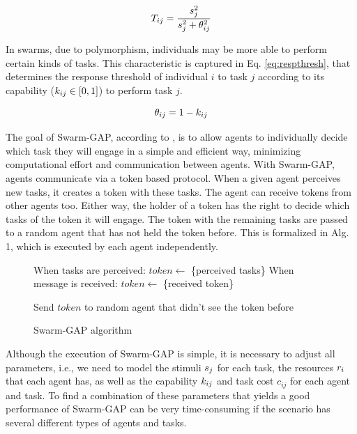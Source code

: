 \documentclass[conference]{IEEEtran}
\begin{document}
\begin{equation}
\label{eq:tendency}
\tendency{i}{j} = \frac{\stimulus{j}^2}{\stimulus{j}^2 + \respthresh{i}{j}^2}
\end{equation}

In swarms, due to polymorphism, individuals may be more able to perform certain kinds of tasks. This characteristic is captured in Eq. \ref{eq:respthresh}, that determines the response threshold of individual $i$ to task $j$ according to its capability ($k_{ij} \in [0,1]$) to perform task $j$.

\begin{equation}
\label{eq:respthresh}
\respthresh{i}{j} = 1 - \agtcap{i}{j}
\end{equation}

The goal of Swarm-GAP, according to \cite{Ferreira+2008ccmms}, is to allow agents to individually decide which task they will engage in a simple and efficient way, minimizing computational effort and communication between agents. With Swarm-GAP, agents communicate via a token based protocol. When a given agent perceives new tasks, it creates a token with these tasks. The agent can receive tokens from other agents too. Either way, the holder of a token has the right to decide which tasks of the token it will engage. The token with the remaining tasks are passed to a random agent that has not held the token before. This is formalized in Alg. 1, which is executed by each agent independently.


\begin{figure}[ht]
\begin{algorithmic}
\STATE When tasks are perceived: $token \gets$ \{perceived tasks\}
\STATE When message is received: $token \gets$ \{received token\}

\ENDIF
\ENDFOR

\STATE Send $token$ to random agent that didn't see the token before
\end{algorithmic}
\caption{Swarm-GAP algorithm}
\end{figure}

Although the execution of Swarm-GAP is simple, it is necessary to adjust all parameters, i.e., we need to model the stimuli $s_j$ for each task, the resources $r_{i}$ that each agent has, as well as the capability $k_{ij}$ and task cost $c_{ij}$ for each agent and task. To find a combination of these parameters that yields a good performance of Swarm-GAP can be very time-consuming if the scenario has several different types of agents and tasks. 
\end{document}

